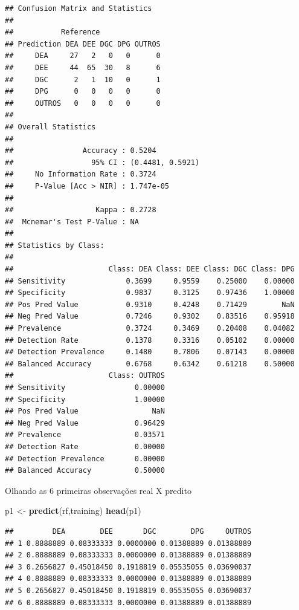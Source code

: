 \documentclass[]{article}
\newenvironment{Shaded}{\begin{snugshade}}{\end{snugshade}}
\newcommand{\KeywordTok}[1]{\textcolor[rgb]{0.13,0.29,0.53}{\textbf{#1}}}
\newcommand{\StringTok}[1]{\textcolor[rgb]{0.31,0.60,0.02}{#1}}
\newcommand{\NormalTok}[1]{#1}
\begin{document}
\begin{verbatim}
## Confusion Matrix and Statistics
## 
##           Reference
## Prediction DEA DEE DGC DPG OUTROS
##     DEA     27   2   0   0      0
##     DEE     44  65  30   8      6
##     DGC      2   1  10   0      1
##     DPG      0   0   0   0      0
##     OUTROS   0   0   0   0      0
## 
## Overall Statistics
##                                           
##                Accuracy : 0.5204          
##                  95% CI : (0.4481, 0.5921)
##     No Information Rate : 0.3724          
##     P-Value [Acc > NIR] : 1.747e-05       
##                                           
##                   Kappa : 0.2728          
##  Mcnemar's Test P-Value : NA              
## 
## Statistics by Class:
## 
##                      Class: DEA Class: DEE Class: DGC Class: DPG
## Sensitivity              0.3699     0.9559    0.25000    0.00000
## Specificity              0.9837     0.3125    0.97436    1.00000
## Pos Pred Value           0.9310     0.4248    0.71429        NaN
## Neg Pred Value           0.7246     0.9302    0.83516    0.95918
## Prevalence               0.3724     0.3469    0.20408    0.04082
## Detection Rate           0.1378     0.3316    0.05102    0.00000
## Detection Prevalence     0.1480     0.7806    0.07143    0.00000
## Balanced Accuracy        0.6768     0.6342    0.61218    0.50000
##                      Class: OUTROS
## Sensitivity                0.00000
## Specificity                1.00000
## Pos Pred Value                 NaN
## Neg Pred Value             0.96429
## Prevalence                 0.03571
## Detection Rate             0.00000
## Detection Prevalence       0.00000
## Balanced Accuracy          0.50000
\end{verbatim}

Olhando as 6 primeiras observações real X predito

\begin{Shaded}
\begin{Highlighting}[]
\NormalTok{p1 <-}\StringTok{ }\KeywordTok{predict}\NormalTok{(rf,training)}
\KeywordTok{head}\NormalTok{(p1)}
\end{Highlighting}
\end{Shaded}

\begin{verbatim}
##         DEA        DEE       DGC        DPG     OUTROS
## 1 0.8888889 0.08333333 0.0000000 0.01388889 0.01388889
## 2 0.8888889 0.08333333 0.0000000 0.01388889 0.01388889
## 3 0.2656827 0.45018450 0.1918819 0.05535055 0.03690037
## 4 0.8888889 0.08333333 0.0000000 0.01388889 0.01388889
## 5 0.2656827 0.45018450 0.1918819 0.05535055 0.03690037
## 6 0.8888889 0.08333333 0.0000000 0.01388889 0.01388889
\end{verbatim}
\end{document}
